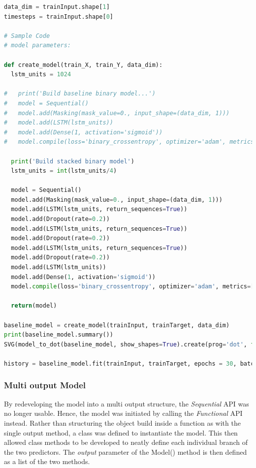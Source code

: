\documentclass[10pt,onecolumn,letterpaper]{article}
\begin{document}
\begin{lstlisting}[language=Python, breaklines=true, caption={Model creation, compilation and fitting functionality of the single output model. The initial single hidden layer model is commented out.}]
data_dim = trainInput.shape[1]
timesteps = trainInput.shape[0]

# Sample Code
# model parameters:

def create_model(train_X, train_Y, data_dim):
  lstm_units = 1024
  
#   print('Build baseline binary model...')
#   model = Sequential()
#   model.add(Masking(mask_value=0., input_shape=(data_dim, 1)))
#   model.add(LSTM(lstm_units))
#   model.add(Dense(1, activation='sigmoid'))
#   model.compile(loss='binary_crossentropy', optimizer='adam', metrics=['accuracy'])
  
  print('Build stacked binary model')
  lstm_units = int(lstm_units/4)

  model = Sequential()
  model.add(Masking(mask_value=0., input_shape=(data_dim, 1)))
  model.add(LSTM(lstm_units, return_sequences=True))
  model.add(Dropout(rate=0.2))
  model.add(LSTM(lstm_units, return_sequences=True))
  model.add(Dropout(rate=0.2))
  model.add(LSTM(lstm_units, return_sequences=True))
  model.add(Dropout(rate=0.2))
  model.add(LSTM(lstm_units))
  model.add(Dense(1, activation='sigmoid'))
  model.compile(loss='binary_crossentropy', optimizer='adam', metrics=['accuracy'])

  return(model)

baseline_model = create_model(trainInput, trainTarget, data_dim)
print(baseline_model.summary())
SVG(model_to_dot(baseline_model, show_shapes=True).create(prog='dot', format='svg'))

history = baseline_model.fit(trainInput, trainTarget, epochs = 30, batch_size = 1024, verbose = 1)

\end{lstlisting} 

\subsubsection{Multi output Model}

By redeveloping the model into a multi output structure, the \textit{Sequential} API was no longer usable. Hence, the model was initiated by calling the \textit{Functional} API instead. Rather than structuring the object build inside a function as with the single output method, a class was defined to instantiate the model. This then allowed class methods to be developed to neatly define each individual branch of the two predictors. The \textit{output} parameter of the Model() method is then defined as a list of the two methods.
\end{document}

